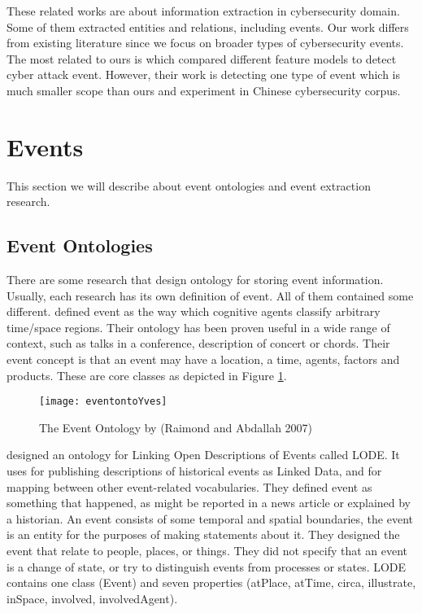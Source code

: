 \indent These related works are about information extraction in cybersecurity domain. Some of them extracted entities and relations, including events. Our work differs from existing literature since we focus on broader types of cybersecurity events. The most related to ours is \cite{qiu2016feature} which compared different feature models to detect cyber attack event. However, their work is detecting one type of event which is much smaller scope than ours and experiment in Chinese cybersecurity corpus.

\section{Events}
\label{events}
This section we will describe about event ontologies and event extraction research.
\subsection{Event Ontologies}
\label{eventontologies}
There are some research that design ontology for storing event information. Usually, each research has its own definition of event. All of them contained some different. \cite{raimond2007event} defined event as the way which cognitive agents classify arbitrary time/space regions. Their ontology has been proven useful in a wide range of context, such as talks in a conference, description of concert or chords. Their event concept is that an event may have a location, a time, agents, factors and products. These are core classes as depicted in Figure \ref{fig:eventontoYves}. \\
\begin{figure}[ht]
    \centering
    \texttt{[image: eventontoYves]}
    \caption{The Event Ontology by (Raimond and Abdallah 2007)}
    \label{fig:eventontoYves}
\end{figure}
\indent \cite{shaw2009lode} designed an ontology for Linking Open Descriptions of Events called LODE. It uses for publishing descriptions of historical events as Linked Data, and for mapping between other event-related vocabularies. They defined event as something that happened, as might be reported in a news article or explained by a historian. An event consists of some temporal and spatial boundaries, the event is an entity for the purposes of making statements about it. They designed the event that relate to people, places, or things. They did not specify that an event is a change of state, or try to distinguish events from processes or states. LODE contains one class (Event) and seven properties (atPlace, atTime, circa, illustrate, inSpace, involved, involvedAgent). \\
